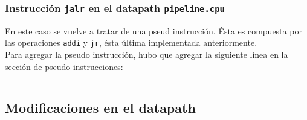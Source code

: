 \documentclass[a4paper,10pt]{article}
\begin{document}
\subsubsection{Instrucción \texttt{jalr} en el datapath \texttt{pipeline.cpu}}
En este caso se vuelve a tratar de una pseud instrucción. Ésta es compuesta por las operaciones \texttt{addi} y \texttt{jr}, ésta última implementada anteriormente.\\
Para agregar la pseudo instrucción, hubo que agregar la siguiente línea en la sección de pseudo instrucciones:
\begin{lstlisting}[breaklines=true]
\end{lstlisting}




\subsection{Modificaciones en el datapath}
\end{document}
